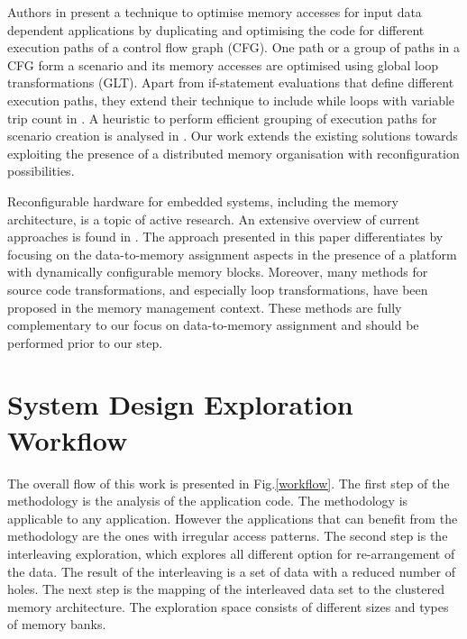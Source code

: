 \documentclass[prodmode,acmtodaes]{acmsmall}
\begin{document}
Authors in \cite{Pal06} present a technique to optimise memory accesses for input data dependent applications by duplicating and optimising the code for different execution paths of a control flow graph (CFG). 
One path or a group of paths in a CFG form a scenario and its memory accesses are optimised using global loop transformations (GLT). 
Apart from if-statement evaluations that define different execution paths, they extend their technique to include while loops with variable trip count in \cite{Pal06b}. 
A heuristic to perform efficient grouping of execution paths for scenario creation is analysed in \cite{Pal07}. 
Our work extends the existing solutions towards exploiting the presence of a distributed memory organisation with reconfiguration possibilities.

Reconfigurable hardware for embedded systems, including the memory architecture, is a topic of active research. 
An extensive overview of current approaches is found in \cite{Garcia}. 
The approach presented in this paper differentiates by focusing on the data-to-memory assignment aspects in the presence of a platform with dynamically configurable memory blocks. 
Moreover, many methods for source code transformations, and especially loop transformations, have been proposed in the memory management context. 
These methods are fully complementary to our focus on data-to-memory assignment and should be performed prior to our step. 

\section{System Design Exploration Workflow}

The overall flow of this work is presented in Fig.\ref{workflow}. 
The first step of the methodology is the analysis of the application code. 
The methodology is applicable to any application.
However the applications that can benefit from the methodology are the ones with irregular access patterns.
The second step is the interleaving exploration, which explores all different option for re-arrangement of the data.
The result of the interleaving is a set of data with a reduced number of holes.
The next step is the mapping of the interleaved data set to the clustered memory architecture.
The exploration space consists of different sizes and types of memory banks.
\end{document}
